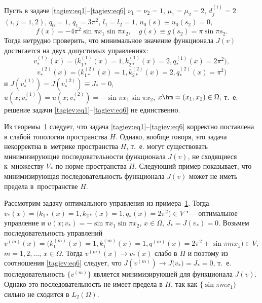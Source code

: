 \smallskip

\hypertarget{tag:ex1}{}
\begin{example}[1]Пусть в задаче \eqref{tagiev:eq1}--\eqref{tagiev:eq6} $\nu _1 =\nu 
_2 =1$, $\mu _1 =\mu _2 =2$, $d_j^{(i)} =2$ $(i,j=1,2)$, $q_0 =1$, $q_1 =3\pi^2$, $l_1 =l_2 =1$,
$u_0 (s)\equiv u_0 (s_2 )=0$, 
$$f(x)=-4\pi ^2\sin \pi x_1 \sin \pi x_2,\quad g(s)\equiv g(s_2 )=\pi \sin \pi s_2.$$ 
Тогда нетрудно проверить, что 
минимальное значение функционала $J( v  )$ достигается на двух 
допустимых управлениях: 
$$ v  _\ast ^{ ( 1 )} ( x  )= \bigl( k_{1\ast }^{ ( 1 )} ( x )=1 , k_{2\ast}^{ ( 1 )} ( x )=2, q_\ast ^{ ( 1 )} ( x 
 )=2\pi^2 \bigr),$$ 
$$ v  _\ast ^{ ( 2 )} ( x )= \bigl(k_{1\ast }^{ ( 2 )} ( x )=1, k_{2\ast }^{ (2)} ( x )=2, q_\ast ^{ ( 2 )} ( x )=\pi  ^2 \bigr)$$ 
и 
$J( v  _\ast ^{(1)})=J( v  _\ast ^{(2)} )\equiv J_\ast =0$,
$u (x; v  _\ast ^{(1)} )=u (x; v  _\ast  ^{ (2)})=-\sin \pi x_1 \sin \pi x_2$,
$x\hm =(x_1 ,x_2 )\in \Omega,$ 
т.~е. решение задачи \eqref{tagiev:eq1}--\eqref{tagiev:eq6} не единственно.
\end{example}

\smallskip

\begin{remark}[2] Из теоремы~\hyperlink{tag:th1}{1} следует, что задача \eqref{tagiev:eq1}--\eqref{tagiev:eq6} корректно поставлена в слабой топологии пространства $H$. 
Однако, вообще говоря, это задача некорректна в~метрике пространства $H$, т.~е. могут существовать 
минимизирующие последовательности функционала $J( v  )$, не сходящиеся к~множеству $V_\ast $ по норме пространства $H$. 
Следующий пример 
показывает, что минимизирующая последовательность функционала $J( v  )$ 
может не иметь предела в~пространстве $H$.
\end{remark} 

\smallskip

\begin{example}[2]Рассмотрим задачу оптимального управления из примера~\hyperlink{tag:ex1}{1}. 
Тогда $ v  _\ast (x)=\bigl(k_{1\ast } (x)=1, k_{2\ast } (x)=1, q_\ast (x)=2\pi^2 \bigr)\in V$ "--- оптимальное управление и 
$u(x; v  _\ast  )=-\sin \pi x_1 \sin \pi x_2$, $x\in \Omega$, $J_\ast =J( v  _\ast )=0$. 
Возьмем последовательность управлений 
$$ v   ^{(m)}(x)=\bigl(k_1^{(m)} (x)=1, k_1^{(m)} (x)=1, q^{(m)}(x)=2\pi ^2 + \sin \pi mx_1 \bigr) \in V,$$ 
$m=1,2,\ldots$, $x \in \Omega. $
Тогда $ v   ^{(m)}(x)\to  v  _\ast (x)$ слабо в $H$ и поэтому из  соотношения \eqref{tagiev:eq6} следует, что $J( v  ^{(m)})\to J\big( v  _\ast \big)=J_\ast =0$, т.~е. последовательность $ \{ v  ^{(m)} \}$ является минимизирующей для 
функционала $J( v  )$. 
Однако это последовательность не имеет предела 
в $H$, так как $\big\{\sin \pi mx_1 \big\}$ сильно не сходится в $L_2 (\Omega)$.
\end{example}

